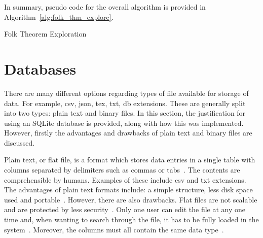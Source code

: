 In summary, pseudo code for the overall algorithm is provided
in Algorithm~\ref{alg:folk_thm_explore}.

\IncMargin{2em}
\begin{algorithm}[H]
    \footnotesize
    \DontPrintSemicolon

    \caption{Folk Theorem Exploration}\label{alg:folk_thm_explore}
\end{algorithm}
\DecMargin{2em}

\section{Databases}\label{sec:Databases}
There are many different options regarding types of file available for storage of
data. For example, csv, json, tex, txt, db extensions. These are generally split into
two types: plain text and binary files. In this section, the justification for
using an SQLite database is provided, along with how this was implemented.
However, firstly the advantages and drawbacks of plain text and binary files are
discussed.

Plain text, or flat file, is a format which stores data entries in a single table
with columns separated by delimiters such as commas or tabs~\cite{Techopedia2011}.
The contents are comprehensible by humans. Examples of these
include csv and txt extensions. The advantages of plain text formats include: a simple
structure, less disk space used and portable~\cite{Techopedia2011}. However, there
are also drawbacks. Flat files are not scalable and
are protected by less security~\cite{Thomas2018}. Only one user can edit the file at any one time
and, when wanting to search through the file, it has to be fully loaded in the
system~\cite{Burke2017}. Moreover, the columns must all contain the same data type~\cite{Techopedia2011}.

